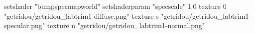 setshader "bumpspecmapworld"
setshaderparam "specscale" 1.0
texture 0 "getridou/getridou_labtrim1-diffuse.png"
texture s "getridou/getridou_labtrim1-specular.png"
texture n "getridou/getridou_labtrim1-normal.png"
